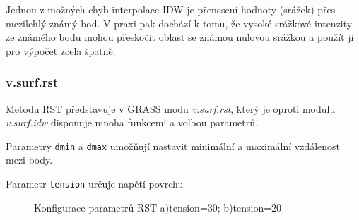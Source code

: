 \documentclass[a4paper,12pt,oneside]{report}
\begin{document}
Jednou z možných chyb interpolace IDW je přenesení hodnoty (srážek) přes mezilehlý známý bod. V praxi pak dochází k tomu, že vysoké srážkové intenzity ze známého bodu mohou přeskočit oblast  se známou nulovou srážkou a použít ji pro výpočet zcela špatně.



\subsubsection*{v.surf.rst}
Metodu RST představuje v GRASS modu \textit{v.surf.rst}, který je oproti modulu \textit{v.surf.idw} disponuje mnoha funkcemi a volbou parametrů.

\begin{description}
\item Parametry \texttt{dmin} a \texttt{dmax} umožňují nastavit minimální a maximální vzdálenost mezi body.
\item Parametr \texttt{tension} určuje napětí povrchu
\end{description}


\begin{figure}[h!]%
    \centering
    \qquad
    \caption[Interpolace RST]{Konfigurace parametrů RST a)tension=30; b)tension=20 \centering}%
    \label{fig:example}%
\end{figure}
\end{document}
